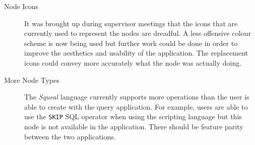 \begin{description}

	\item[Node Icons] \hfill

		It was brought up during supervisor meetings that the icons that are
		currently used to represent the nodes are dreadful. A less offensive
		colour scheme is now being used but further work could be done in order
		to improve the aesthetics and usability of the application. The
		replacement icons could convey more accurately what the node was
		actually doing.

	\item[More Node Types] \hfill

		The \emph{Squeal} language currently supports more operations than the
		user is able to create with the query application. For example, users
		are able to use the \texttt{SKIP} \ac{SQL} operator when using the
		scripting language but this node is not available in the application.
		There should be feature parity between the two applications.

\end{description}

